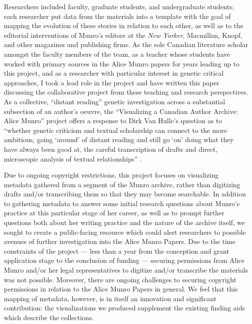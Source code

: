 \documentclass{article}
\begin{document}
Researchers included faculty, graduate students, and undergraduate
students; each researcher put data from the materials into a template
with the goal of mapping the evolution of these stories in relation to
each other, as well as to the editorial interventions of Munro's editors
at the \emph{New Yorker}, Macmillan, Knopf, and other magazines and
publishing firms. As the sole Canadian literature scholar amongst the
faculty members of the team, as a teacher whose students have worked
with primary sources in the Alice Munro papers for years leading up to
this project, and as a researcher with particular interest in genetic
critical approaches, I took a lead role in the project and have written
this paper discussing the collaborative project from these teaching and
research perspectives. As a collective, ``distant reading'' genetic
investigation across a substantial subsection of an author's oeuvre, the
``Visualizing a Canadian Author Archive: Alice Munro'' project offers a
response to Dirk Van Hulle's question as to ``whether genetic criticism
and textual scholarship can connect to the more ambitious, going
`around' of distant reading and still go `on' doing what they have
always been good at, the careful transcription of drafts and direct,
microscopic analysis of textual relationships'' \citep[189]{van_hulle_genetic_2022}.

Due to ongoing copyright restrictions, this project focuses on
visualizing metadata gathered from a segment of the Munro archive,
rather than digitizing drafts and/or transcribing them so that
they may become searchable. In addition to gathering metadata to answer some
initial research questions about Munro's practice at this particular
stage of her career, as well as to prompt further questions both about
her writing practice and the nature of the archive itself, we sought to
create a public-facing resource which could alert researchers to
possible avenues of further investigation into the Alice Munro Papers.
Due to the time constraints of the project –– less than a year from the
conception and grant application stage to the conclusion of
funding –– securing permissions from Alice Munro and/or her legal
representatives to digitize and/or transcribe the materials was not
possible. Moreover, there are ongoing challenges to securing copyright
permissions in relation to the Alice Munro Papers in general. We feel
that this mapping of metadata, however, is in itself an innovation and
significant contribution: the visualizations we produced supplement the
existing finding aids which describe the collections.
\end{document}
